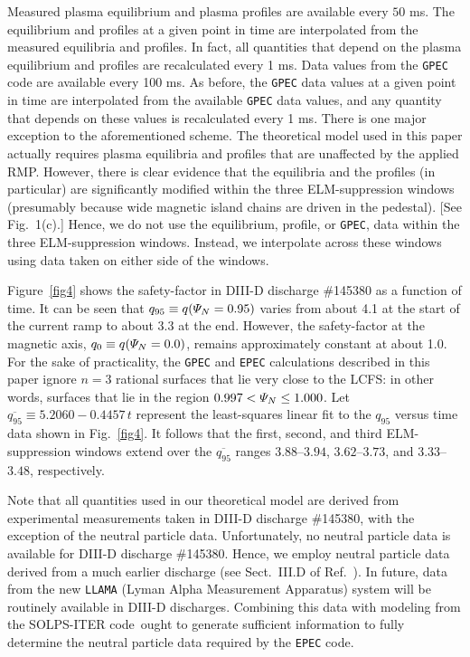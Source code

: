 \documentclass[12pt,prb,aps]{revtex4-1}
\begin{document}
Measured plasma equilibrium and
plasma profiles are available every $50$ ms. The equilibrium and profiles  at a given point in time are interpolated from
the measured equilibria and profiles. In fact, all quantities that depend on the plasma equilibrium and profiles are recalculated every 1 ms.  Data values from the
{\tt GPEC} code are available every 100 ms. As before, the {\tt GPEC} data values at a given point in time are interpolated from the
available {\tt GPEC} data values, and any quantity that depends on these values is recalculated every 1 ms. There is one major exception to
the aforementioned scheme. The theoretical model used in this paper actually requires plasma equilibria and profiles that are unaffected
by the applied RMP. However, there is clear evidence that the equilibria and the profiles (in particular) are significantly modified
within the three ELM-suppression windows (presumably because wide magnetic island chains are driven in the pedestal). [See Fig.~1(c).]
Hence, we do not use the equilibrium, profile, or {\tt GPEC}, data within the three ELM-suppression windows. Instead, we
interpolate across these windows using data taken on either side of the windows. 

Figure~\ref{fig4} shows the safety-factor in DIII-D discharge \#145380 as a function of time. It can be seen
that $q_{95}\equiv q({\mit\Psi}_N=0.95)$ varies from about 4.1 at the start of the current ramp to about 3.3
at the end. However, the safety-factor at the magnetic axis, $q_0 \equiv q({\mit\Psi}_N=0.0)$, remains approximately
constant at about 1.0. For the sake of practicality,  the {\tt GPEC} and {\tt EPEC} calculations described in this paper ignore $n=3$ rational
surfaces that lie very close to the LCFS: in other words,  surfaces that lie in the region $0.997 < {\mit\Psi}_N\leq 1.000$. Let $\overline{q_{95}}\equiv 5.2060-0.4457\,t$ represent the
least-squares linear fit to the $q_{95}$ versus time data shown in Fig.~\ref{fig4}. 
It follows that the 
first, second, and third ELM-suppression windows extend over the $\overline{q_{95}}$ ranges $3.88$--$3.94$, $3.62$--$3.73$,
and $3.33$--$3.48$, respectively. 

Note that all quantities used in our theoretical model are derived from experimental measurements taken in DIII-D discharge \#145380, with the exception of the neutral particle data. 
Unfortunately, no neutral particle data is available for DIII-D discharge \#145380.
Hence, we employ neutral particle data derived from a much earlier discharge (see Sect.~III.D of Ref.~).\cite{neutral}
In future, data from the new {\tt LLAMA} (Lyman Alpha Measurement Apparatus) system will be routinely available in DIII-D discharges.\cite{llama}
Combining this data  with modeling from the SOLPS-ITER code\,\cite{solps} ought to generate sufficient information to fully determine the
neutral particle data required by the {\tt EPEC} code.  
\end{document}
